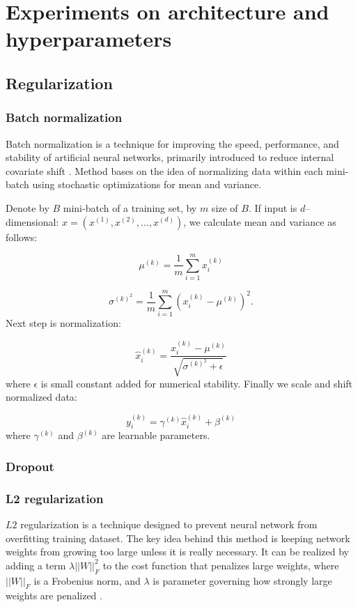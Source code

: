 \documentclass[licencjacka,en]{pracamgr}
\begin{document}
\chapter{Experiments on architecture and hyperparameters}\label{r:hypers}

\section{Regularization}
\subsection{Batch normalization}
Batch normalization is a technique for improving the speed, performance, and stability of artificial neural networks, primarily introduced to reduce internal covariate shift \cite{BN}. Method bases on the idea of normalizing data within each mini-batch using stochastic optimizations for mean and variance.

Denote by $B$ mini-batch of a training set, by $m$ size of $B$. If input is $d$--dimensional: $x = (x^{(1)}, x^{(2)}, \ldots, x^{(d)})$, we calculate mean and variance as follows:

$$\mu^{(k)} = \frac{1}{m}\sum_{i=1}^m x^{(k)}_i$$

$$ \sigma^{{(k)}^2} = \frac{1}{m} \sum_{i = 1}^{m} \left(x^{(k)}_i - \mu^{(k)}\right) ^ 2.$$
Next step is normalization:

$$
\hat{x} ^ {(k)} _ i = \frac{x^{(k)}_i - \mu^{(k)}} {\sqrt{ \sigma^{{(k)}^2} + \epsilon}}
$$
where $\epsilon$ is small constant added for numerical stability. Finally we scale and shift normalized data:

$$ y^{(k)}_i = \gamma^{(k)} \hat{x}^{(k)}_i + \beta^{(k)}$$
where $\gamma^{(k)}$ and $\beta^{(k)}$ are learnable parameters.


\subsection{Dropout}
\subsection{L2 regularization}
$L2$ regularization is a technique designed to prevent neural network from overfitting training dataset. The key idea behind this method is keeping network weights from growing too large unless it is really necessary. It can be realized by adding a term $\lambda ||W||^2_F $ to the cost function that penalizes large weights, where $||W||_F $ is
a Frobenius norm, and $\lambda$ is parameter governing how strongly large weights are penalized \cite{L2}.
\end{document}
